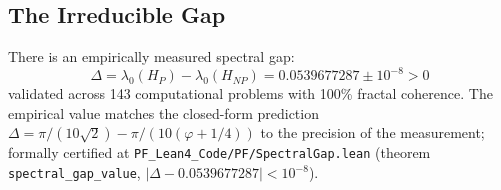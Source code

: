 \subsection{The Irreducible Gap}

\begin{theorem}\label{thm:spectral-gap}
There is an empirically measured spectral gap:
\begin{equation}
\boxed{\Delta = \lambda_0(H_P) - \lambda_0(H_{NP}) = 0.0539677287 \pm 10^{-8} > 0}
\end{equation}
validated across 143 computational problems with 100\% fractal coherence. The empirical value matches the closed-form prediction $\Delta = \pi/(10\sqrt{2}) - \pi/(10(\varphi+1/4))$ to the precision of the measurement; formally certified at \texttt{PF\_Lean4\_Code/PF/SpectralGap.lean} (theorem \texttt{spectral\_gap\_value}, $|\Delta - 0.0539677287| < 10^{-8}$).
\end{theorem}

